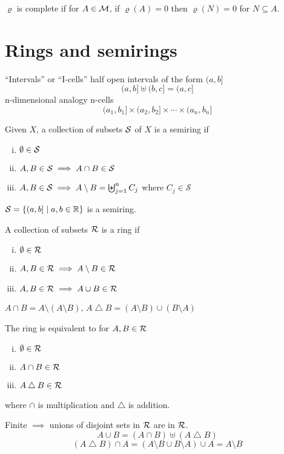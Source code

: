\begin{definition}
  $\varrho$ is complete if for $A \in \mathcal M$, if $\varrho(A) = 0$ then $\varrho(N) = 0$ for $N \subseteq A$.
\end{definition}

\section{Rings and semirings}

``Intervals'' or ``I-cells'' half open intervals of the form $(a, b]$
\[(a, b] \uplus (b, c] = (a, c]\]
n-dimensional analogy n-cells
\[(a_1, b_1] \times (a_2, b_2] \times \dotsm \times (a_n, b_n]\]

\begin{definition}[Semiring]
  Given $X$, a collection of subsets $\mathcal S$ of $X$ is a semiring if 
  \begin{enumerate}[(i)]
    \item $\emptyset \in \mathcal S$
    \item $A, B \in \mathcal S \implies A \cap B \in \mathcal S$
    \item $A, B \in \mathcal S \implies A \setminus B = \biguplus_{j=1}^n C_j$ where $C_j \in \mathcal{S}$
  \end{enumerate}
\end{definition}

\begin{example}
  $\mathcal S = \{(a, b] \mid a, b \in \mathbb R\}$ is a semiring.
\end{example}

\begin{definition}[Ring]
  A collection of subsets $\mathcal R$ is a ring if 
  \begin{enumerate}[(i)]
    \item $\emptyset \in \mathcal R$
    \item $A, B \in \mathcal R \implies A \setminus B \in \mathcal R$
    \item $A, B \in \mathcal R \implies A \cup B \in \mathcal R$
  \end{enumerate}
\end{definition}

\begin{remark}
  $A \cap B = A \setminus (A \setminus B)$, $A \bigtriangleup B = (A \setminus B) \cup (B \setminus A)$
  
  The ring is equivalent to for $A, B \in \mathcal R$
  \begin{enumerate}[(i)]
    \item $\emptyset \in \mathcal R$
    \item $A \cap B \in \mathcal R$
    \item $A \bigtriangleup B \in \mathcal R$
  \end{enumerate}
  where $\cap$ is multiplication and $\bigtriangleup$ is addition.

  Finite $\implies$ unions of disjoint sets in $\mathcal R$ are in $\mathcal R$.
  \[A \cup B = (A \cap B) \uplus (A \bigtriangleup B)\]
  \[(A \bigtriangleup B)\cap A = (A \setminus B \cup B \setminus A) \cup A = A \setminus B\]
\end{remark}
  
